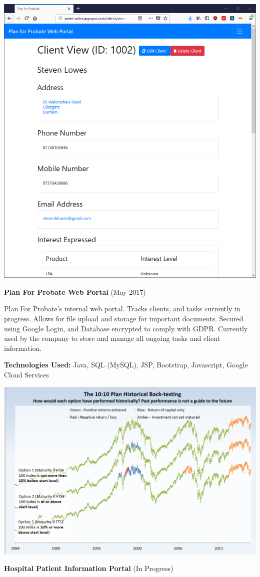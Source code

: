 \documentclass[hidelinks, 12pt, a4paper]{article}
\begin{document}
	\hspace{0.02\textwidth}
	\begin{minipage}{0.40\textwidth}		
		\begin{center}
			\includegraphics[width=0.9\linewidth]{planforprobate.png}
		\end{center}
		\vspace{-12pt}
		\textbf{Plan For Probate Web Portal} (May 2017)
		
		Plan For Probate's internal web portal. Tracks clients, and tasks currently in progress. Allows for file upload and storage for important documents. Secured using Google Login, and Database encrypted to comply with GDPR. Currently used by the company to store and manage all ongoing tasks and client information.
		
		\textbf{Technologies Used:} Java, SQL (MySQL), JSP, Bootstrap, Javascript, Google Cloud Services
		
		\begin{center}
			\includegraphics[width=0.9\linewidth]{backtest.png}
		\end{center}
		\vspace{-12pt}
		\textbf{Hospital Patient Information Portal} (In Progress)
		

\end{minipage}
\end{document}
